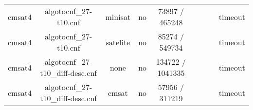 \begin{appendices}
\begin{table}[p]
\begin{center}
\begin{tabular}{l|cccccccc}
  cmsat4                         & algotocnf\_27-t10.cnf          & minisat    & no    & 73897 / 465248 &           &           &            & timeout \\ %
  cmsat4                         & algotocnf\_27-t10.cnf          & satelite   & no    & 85274 / 549734 &           &           &            & timeout \\ %
  cmsat4                         & algotocnf\_27-t10\_diff-desc.cnf & none       & no    & 134722 / 1041335 &           &           &            & timeout \\ %
  cmsat4                         & algotocnf\_27-t10\_diff-desc.cnf & cmsat      & no    & 57956 / 311219 &           &           &            & timeout \\ %
    \end{tabular}
  \end{center}
\end{table}

\newpage


\end{appendices}
